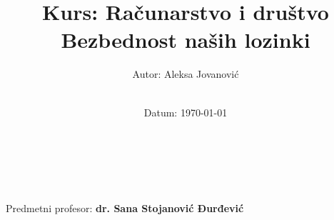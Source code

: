 \title{\Large Kurs: Računarstvo i društvo  \\[0.5cm]
        \bf\Large Bezbednost naših lozinki}
\author{\large Autor: Aleksa Jovanović\\ \ \\}
\date{\large Datum: \today}

\makeatletter
    \begin{titlepage}
        \begin{center}
	    {\ \\ \ \\}
        \vbox{}\vspace{5cm}
            {\@title }\\[3cm] 
            {\@author}
            {\large Predmetni profesor: \bf dr. Sana Stojanović Đurđević\\  \ \\}
            {\@date\\}

        \end{center}
    \end{titlepage}
\makeatother